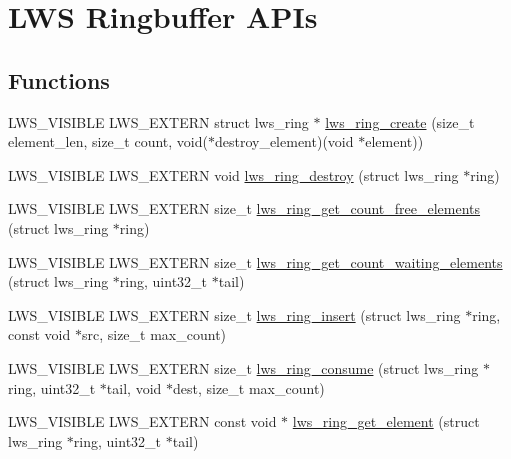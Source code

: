 \hypertarget{group__lws__ring}{}\section{L\+WS Ringbuffer A\+P\+Is}
\label{group__lws__ring}
\subsection*{Functions}
\begin{DoxyCompactItemize}
\item 
L\+W\+S\+\_\+\+V\+I\+S\+I\+B\+LE L\+W\+S\+\_\+\+E\+X\+T\+E\+RN struct lws\+\_\+ring $\ast$ \hyperlink{group__lws__ring_ga3c9d92d25a17879f77e13eb481c5a82d}{lws\+\_\+ring\+\_\+create} (size\+\_\+t element\+\_\+len, size\+\_\+t count, void($\ast$destroy\+\_\+element)(void $\ast$element))
\item 
L\+W\+S\+\_\+\+V\+I\+S\+I\+B\+LE L\+W\+S\+\_\+\+E\+X\+T\+E\+RN void \hyperlink{group__lws__ring_ga0e671dbbb18af91d23e78026d49bc6e2}{lws\+\_\+ring\+\_\+destroy} (struct lws\+\_\+ring $\ast$ring)
\item 
L\+W\+S\+\_\+\+V\+I\+S\+I\+B\+LE L\+W\+S\+\_\+\+E\+X\+T\+E\+RN size\+\_\+t \hyperlink{group__lws__ring_ga711d92a1046c2a34860a2babd68aec32}{lws\+\_\+ring\+\_\+get\+\_\+count\+\_\+free\+\_\+elements} (struct lws\+\_\+ring $\ast$ring)
\item 
L\+W\+S\+\_\+\+V\+I\+S\+I\+B\+LE L\+W\+S\+\_\+\+E\+X\+T\+E\+RN size\+\_\+t \hyperlink{group__lws__ring_ga5e3cb460d9af061b5b60dc35d4e2ea95}{lws\+\_\+ring\+\_\+get\+\_\+count\+\_\+waiting\+\_\+elements} (struct lws\+\_\+ring $\ast$ring, uint32\+\_\+t $\ast$tail)
\item 
L\+W\+S\+\_\+\+V\+I\+S\+I\+B\+LE L\+W\+S\+\_\+\+E\+X\+T\+E\+RN size\+\_\+t \hyperlink{group__lws__ring_ga00fcaf9c2e3b16e9a667120ae214cc30}{lws\+\_\+ring\+\_\+insert} (struct lws\+\_\+ring $\ast$ring, const void $\ast$src, size\+\_\+t max\+\_\+count)
\item 
L\+W\+S\+\_\+\+V\+I\+S\+I\+B\+LE L\+W\+S\+\_\+\+E\+X\+T\+E\+RN size\+\_\+t \hyperlink{group__lws__ring_ga1ad6706af708096eba401a48f67bf865}{lws\+\_\+ring\+\_\+consume} (struct lws\+\_\+ring $\ast$ring, uint32\+\_\+t $\ast$tail, void $\ast$dest, size\+\_\+t max\+\_\+count)
\item 
L\+W\+S\+\_\+\+V\+I\+S\+I\+B\+LE L\+W\+S\+\_\+\+E\+X\+T\+E\+RN const void $\ast$ \hyperlink{group__lws__ring_ga4bc75cf61aed9737f54bef9b79b54e58}{lws\+\_\+ring\+\_\+get\+\_\+element} (struct lws\+\_\+ring $\ast$ring, uint32\+\_\+t $\ast$tail)

\end{DoxyCompactItemize}
